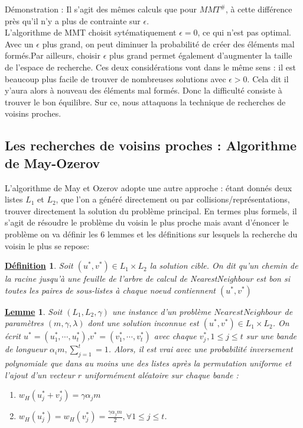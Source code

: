 \documentclass[12pt,openany]{report}
\newtheorem{definition}{\underline{Définition}}
\newtheorem{lemme}{\underline{Lemme}}
\begin{document}
Démonstration : Il s’agit des mêmes calculs que pour $MMT^{\#}$, à cette différence
près qu’il n’y a plus de contrainte sur $ \epsilon $.\\

L'algorithme de MMT choisit sytématiquement $\epsilon =0  $, ce qui n'est pas optimal. Avec un $\epsilon $ plus grand, on peut diminuer la probabilité de créer des éléments mal formés.Par ailleurs, choisir $\epsilon $ plus grand permet également d'augmenter la taille de l'espace de recherche. Ces deux
considérations vont dans le même sens : il est beaucoup plus facile de trouver
de nombreuses solutions avec $ \epsilon > 0$.\hspace{0.2cm} Cela dit il y'aura alors à nouveau des éléments mal formés. Donc la difficulté consiste à trouver  le bon équilibre. Sur ce, nous attaquons la technique de recherches de voisins proches.

\subsection{Les recherches de voisins proches : Algorithme de  May-Ozerov}
L’algorithme de May et Ozerov
adopte une autre approche : étant donnés deux listes $L_1$ et $L_2$, que l’on a généré
directement ou par collisions/représentations, trouver directement la solution
du problème principal. En termes plus formels, il s’agit de résoudre le problème
du voisin le plus proche mais avant d'énoncer le problème on va définir les 6 lemmes \cite{Ghazal} et les définitions sur lesquels la recherche du voisin le plus se repose:
\begin{definition} Soit $({u^{*}},{v^{*}}) \in L_1 \times L_2 $  la solution cible. On dit qu’un chemin
de la racine jusqu’à une feuille de l’arbre de calcul de NearestNeighbour est bon
si toutes les paires de sous-listes à chaque noeud contiennent $({u^{*}},{v^{*}})$

\end{definition}
\begin{lemme} Soit $(L_1,L_2,\gamma)  $ une instance d'un problème $ Nearest Neighbour $ de paramètres $(m,\gamma,\lambda) $ dont une solution inconnue est $  ( {u^{*}}, {v^{*}} ) \in L_1 \times L_2 $. On écrit $ {u^{*}}=({u^{*}_{1}},\cdots,{u^{*}_{t}})$,${v^{*}}=({v^{*}_{1}},\cdots,{v^{*}_{t}})$ avec chaque ${v^{*}_{j}}, 1 \leq j \leq t  $ sur une bande de longueur $\alpha_i m , \sum_{j=1}^{t}=1$. Alors, il est vrai avec une probabilité inversement
polynomiale que dans au moins une des listes après la permutation uniforme et
l’ajout d’un vecteur $r$ uniformément aléatoire sur chaque bande :
\begin{enumerate}
\item $ w_H({u^{*}_{j}}+ {v^{*}_{j}} )=\gamma \alpha_j m   $
\item $  w_H({u^{*}_{j}} )= w_H({v^{*}_{j}} )= \frac{\gamma \alpha_j m }{2}   , \forall 1 \leq j \leq t $.
\end{enumerate}
\end{lemme}
\end{document}
